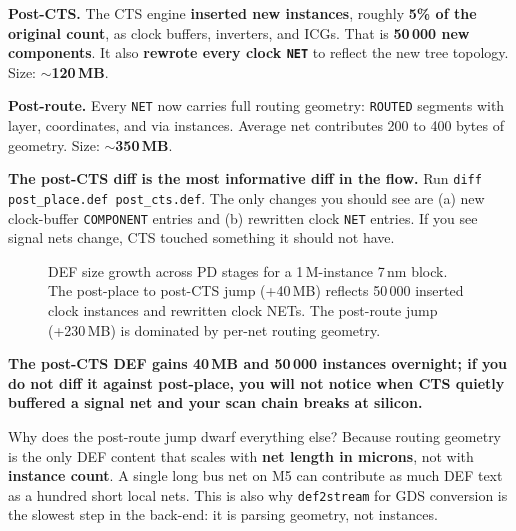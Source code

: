 \textbf{Post-CTS.} The CTS engine \textbf{inserted new instances}, roughly \textbf{5\% of the original count}, as clock buffers, inverters, and ICGs. That is \textbf{50\,000 new components}. It also \textbf{rewrote every clock \texttt{NET}} to reflect the new tree topology. Size: \textbf{$\sim$120\,MB}.

 \textbf{Post-route.} Every \texttt{NET} now carries full routing geometry: \texttt{ROUTED} segments with layer, coordinates, and via instances. Average net contributes 200 to 400 bytes of geometry. Size: \textbf{$\sim$350\,MB}.

 \textbf{The post-CTS diff is the most informative diff in the flow.} Run \texttt{diff post\_place.def post\_cts.def}. The only changes you should see are (a) new clock-buffer \texttt{COMPONENT} entries and (b) rewritten clock \texttt{NET} entries. If you see signal nets change, CTS touched something it should not have.

\begin{figure}[h]
\centering
{}
\caption{DEF size growth across PD stages for a 1\,M-instance 7\,nm block. The post-place to post-CTS jump (+40\,MB) reflects 50\,000 inserted clock instances and rewritten clock NETs. The post-route jump (+230\,MB) is dominated by per-net routing geometry.}
\end{figure}

\begin{hook}
\textbf{The post-CTS DEF gains 40\,MB and 50\,000 instances overnight; if you do not diff it against post-place, you will not notice when CTS quietly buffered a signal net and your scan chain breaks at silicon.}
\end{hook}

\begin{sidebar}
Why does the post-route jump dwarf everything else? Because routing geometry is the only DEF content that scales with \textbf{net length in microns}, not with \textbf{instance count}. A single long bus net on M5 can contribute as much DEF text as a hundred short local nets. This is also why \texttt{def2stream} for GDS conversion is the slowest step in the back-end: it is parsing geometry, not instances.
\end{sidebar}

